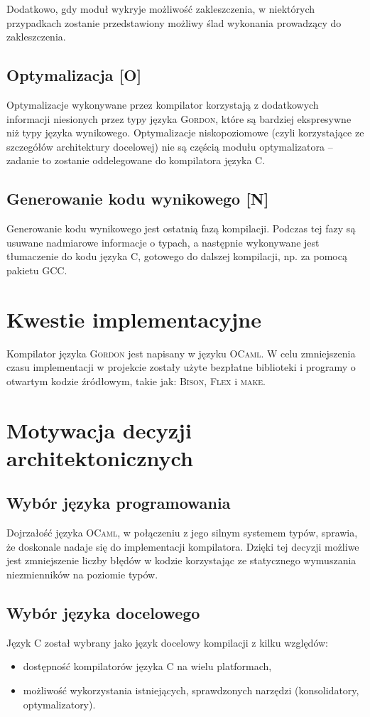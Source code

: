 \documentclass{documentation}
\begin{document}
Dodatkowo, gdy moduł wykryje możliwość zakleszczenia, w niektórych przypadkach
zostanie przedstawiony możliwy ślad wykonania prowadzący do zakleszczenia. 

\subsection{Optymalizacja [O]}
\noindent Optymalizacje wykonywane przez kompilator korzystają z dodatkowych informacji
niesionych przez typy języka \textsc{Gordon}, które są bardziej ekspresywne niż typy języka
wynikowego.
Optymalizacje niskopoziomowe (czyli korzystające ze szczegółów architektury docelowej) nie
są częścią modułu optymalizatora -- zadanie to zostanie oddelegowane do kompilatora języka \textsc{C}.

\subsection{Generowanie kodu wynikowego [N]}
\noindent Generowanie kodu wynikowego jest ostatnią fazą kompilacji. Podczas tej
fazy są usuwane
nadmiarowe informacje o typach, a następnie wykonywane jest tłumaczenie do kodu języka
\textsc{C}, gotowego do dalszej kompilacji, np. za pomocą pakietu \textsc{GCC}.

\section{Kwestie implementacyjne}
\noindent Kompilator języka \textsc{Gordon} jest napisany w języku \textsc{OCaml}. W celu
zmniejszenia czasu implementacji w projekcie zostały użyte bezpłatne biblioteki i programy o otwartym
kodzie źródłowym, takie jak: \textsc{Bison}, \textsc{Flex} i \textsc{make}.

\section{Motywacja decyzji architektonicznych}
\subsection{Wybór języka programowania}
\noindent Dojrzałość języka \textsc{OCaml}, w połączeniu z jego silnym systemem typów,
sprawia, że doskonale nadaje się do implementacji kompilatora. Dzięki tej
decyzji możliwe jest zmniejszenie liczby błędów w kodzie korzystając ze
statycznego wymuszania niezmienników na poziomie typów.

\subsection{Wybór języka docelowego}
\noindent Język \textsc{C} został wybrany jako język docelowy kompilacji z kilku względów:
\begin{itemize}
    \item dostępność kompilatorów języka \textsc{C} na wielu platformach,
    \item możliwość wykorzystania istniejących, sprawdzonych narzędzi (konsolidatory,
        optymalizatory).
\end{itemize}
\end{document}
